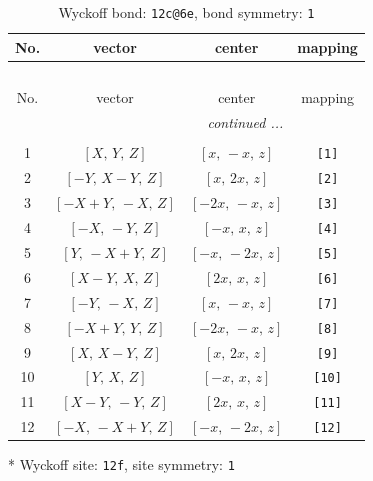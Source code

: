\documentclass[fleqn,8pt]{jsarticle}
\begin{document}
\begin{longtable}{cccc}
\caption{Wyckoff bond: {\tt 12c@6e}, bond symmetry: {\tt 1}}
 \\
 \hline \hline
No. & vector & center & mapping \\ \hline \endfirsthead

\multicolumn{3}{l}{\tablename\ \thetable{}} \\
 \hline \hline
No. & vector & center & mapping \\ \hline \endhead

 \hline \hline
\multicolumn{3}{r}{\footnotesize\it continued ...} \\ \endfoot

 \hline \hline
\multicolumn{3}{r}{} \\ \endlastfoot

1 & $\left[ X,\, Y,\, Z \right]$ & $\left[ x,\, - x,\, z \right]$ & {\tt [1]} \\ \hline
2 & $\left[ - Y,\, X - Y,\, Z \right]$ & $\left[ x,\, 2 x,\, z \right]$ & {\tt [2]} \\ \hline
3 & $\left[ - X + Y,\, - X,\, Z \right]$ & $\left[ - 2 x,\, - x,\, z \right]$ & {\tt [3]} \\ \hline
4 & $\left[ - X,\, - Y,\, Z \right]$ & $\left[ - x,\, x,\, z \right]$ & {\tt [4]} \\ \hline
5 & $\left[ Y,\, - X + Y,\, Z \right]$ & $\left[ - x,\, - 2 x,\, z \right]$ & {\tt [5]} \\ \hline
6 & $\left[ X - Y,\, X,\, Z \right]$ & $\left[ 2 x,\, x,\, z \right]$ & {\tt [6]} \\ \hline
7 & $\left[ - Y,\, - X,\, Z \right]$ & $\left[ x,\, - x,\, z \right]$ & {\tt [7]} \\ \hline
8 & $\left[ - X + Y,\, Y,\, Z \right]$ & $\left[ - 2 x,\, - x,\, z \right]$ & {\tt [8]} \\ \hline
9 & $\left[ X,\, X - Y,\, Z \right]$ & $\left[ x,\, 2 x,\, z \right]$ & {\tt [9]} \\ \hline
10 & $\left[ Y,\, X,\, Z \right]$ & $\left[ - x,\, x,\, z \right]$ & {\tt [10]} \\ \hline
11 & $\left[ X - Y,\, - Y,\, Z \right]$ & $\left[ 2 x,\, x,\, z \right]$ & {\tt [11]} \\ \hline
12 & $\left[ - X,\, - X + Y,\, Z \right]$ & $\left[ - x,\, - 2 x,\, z \right]$ & {\tt [12]} \\
\end{longtable}
* Wyckoff site: {\tt 12f}, site symmetry: {\tt 1}
\renewcommand{\arraystretch}{1.2}
\end{document}
